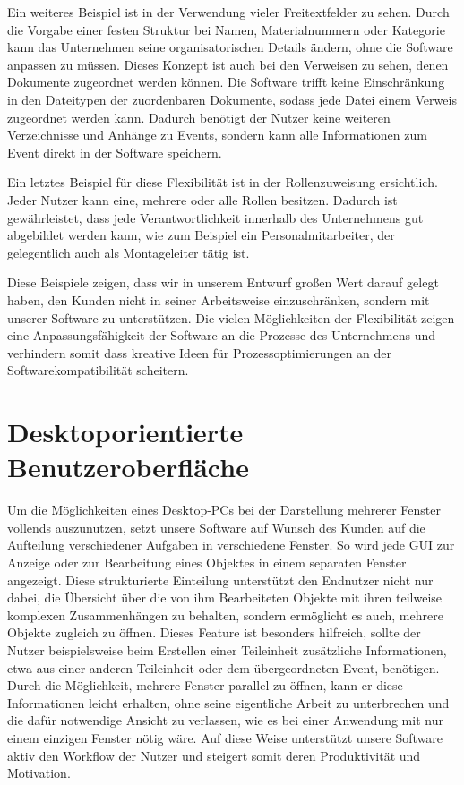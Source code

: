 Ein weiteres Beispiel ist in der Verwendung vieler Freitextfelder zu sehen. Durch die Vorgabe einer festen Struktur bei Namen, Materialnummern oder Kategorie kann das Unternehmen seine organisatorischen Details ändern, ohne die Software anpassen zu müssen. Dieses Konzept ist auch bei den Verweisen zu sehen, denen Dokumente zugeordnet werden können. Die Software trifft keine Einschränkung in den Dateitypen der zuordenbaren Dokumente, sodass jede Datei einem Verweis zugeordnet werden kann. Dadurch benötigt der Nutzer keine weiteren Verzeichnisse und Anhänge zu Events, sondern kann alle Informationen zum Event direkt in der Software speichern.

Ein letztes Beispiel für diese Flexibilität ist in der Rollenzuweisung ersichtlich. Jeder Nutzer kann eine, mehrere oder alle Rollen besitzen. Dadurch ist gewährleistet, dass jede Verantwortlichkeit innerhalb des Unternehmens gut abgebildet werden kann, wie zum Beispiel ein Personalmitarbeiter, der gelegentlich auch als Montageleiter tätig ist.

Diese Beispiele zeigen, dass wir in unserem Entwurf großen Wert darauf gelegt haben, den Kunden nicht in seiner Arbeitsweise einzuschränken, sondern mit unserer Software zu unterstützen. Die vielen Möglichkeiten der Flexibilität zeigen eine Anpassungsfähigkeit der Software an die Prozesse des Unternehmens und verhindern somit dass kreative Ideen für Prozessoptimierungen an der Softwarekompatibilität scheitern.

\section{Desktoporientierte Benutzeroberfläche}
Um die Möglichkeiten eines Desktop-PCs bei der Darstellung mehrerer Fenster vollends auszunutzen, setzt unsere Software auf Wunsch des Kunden auf die Aufteilung verschiedener Aufgaben in verschiedene Fenster. So wird jede GUI zur Anzeige oder zur Bearbeitung eines Objektes in einem separaten Fenster angezeigt. Diese strukturierte Einteilung unterstützt den Endnutzer nicht nur dabei, die Übersicht über die von ihm Bearbeiteten Objekte mit ihren teilweise komplexen Zusammenhängen zu behalten, sondern ermöglicht es auch, mehrere Objekte zugleich zu öffnen. Dieses Feature ist besonders hilfreich, sollte der Nutzer beispielsweise beim Erstellen einer Teileinheit zusätzliche Informationen, etwa aus einer anderen Teileinheit oder dem übergeordneten Event, benötigen. Durch die Möglichkeit, mehrere Fenster parallel zu öffnen, kann er diese Informationen leicht erhalten, ohne seine eigentliche Arbeit zu unterbrechen und die dafür notwendige Ansicht zu verlassen, wie es bei einer Anwendung mit nur einem einzigen Fenster nötig wäre. Auf diese Weise unterstützt unsere Software aktiv den Workflow der Nutzer und steigert somit deren Produktivität und Motivation.

